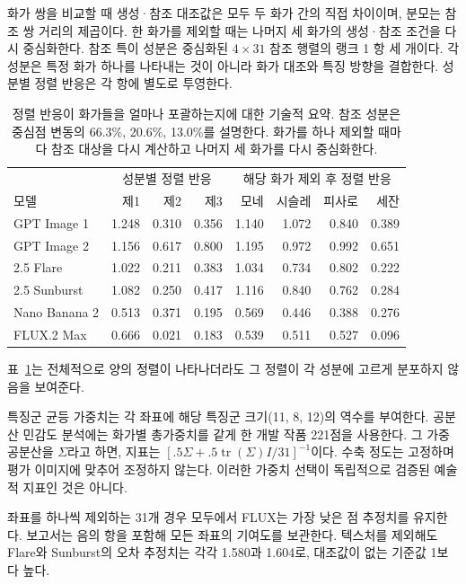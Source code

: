\documentclass[11pt,a4paper]{article}
\begin{document}
화가 쌍을 비교할 때 생성·참조 대조값은 모두 두 화가 간의 직접 차이이며, 분모는 참조 쌍 거리의 제곱이다. 한 화가를 제외할 때는 나머지 세 화가의 생성·참조 조건을 다시 중심화한다. 참조 특이 성분은 중심화된 $4\times31$ 참조 행렬의 랭크 1 항 세 개이다. 각 성분은 특정 화가 하나를 나타내는 것이 아니라 화가 대조와 특징 방향을 결합한다. 성분별 정렬 반응은 각 항에 별도로 투영한다.

\begin{table}[H]
\centering\small\setlength{\tabcolsep}{4pt}
\begin{tabular}{@{}lrrr|rrrr@{}}
\toprule
 & \multicolumn{3}{c}{성분별 정렬 반응} & \multicolumn{4}{c}{해당 화가 제외 후 정렬 반응}\\
모델 & 제1 & 제2 & 제3 & 모네 & 시슬레 & 피사로 & 세잔\\\midrule
GPT Image 1 & 1.248 & 0.310 & 0.356 & 1.140 & 1.072 & 0.840 & 0.389\\
GPT Image 2 & 1.156 & 0.617 & 0.800 & 1.195 & 0.972 & 0.992 & 0.651\\
2.5 Flare & 1.022 & 0.211 & 0.383 & 1.034 & 0.734 & 0.802 & 0.222\\
2.5 Sunburst & 1.082 & 0.250 & 0.417 & 1.116 & 0.840 & 0.762 & 0.284\\
Nano Banana 2 & 0.513 & 0.371 & 0.195 & 0.569 & 0.446 & 0.388 & 0.276\\
FLUX.2 Max & 0.666 & 0.021 & 0.183 & 0.539 & 0.511 & 0.527 & 0.096\\
\bottomrule
\end{tabular}
\caption{정렬 반응이 화가들을 얼마나 포괄하는지에 대한 기술적 요약. 참조 성분은 중심점 변동의 66.3\%, 20.6\%, 13.0\%를 설명한다. 화가를 하나 제외할 때마다 참조 대상을 다시 계산하고 나머지 세 화가를 다시 중심화한다.}
\label{tab:review-components}
\end{table}

표~\ref{tab:review-components}는 전체적으로 양의 정렬이 나타나더라도 그 정렬이 각 성분에 고르게 분포하지 않음을 보여준다.

특징군 균등 가중치는 각 좌표에 해당 특징군 크기(11, 8, 12)의 역수를 부여한다. 공분산 민감도 분석에는 화가별 총가중치를 같게 한 개발 작품 221점을 사용한다. 그 가중 공분산을 $\Sigma$라고 하면, 지표는 $[.5\Sigma+.5\operatorname{tr}(\Sigma)I/31]^{-1}$이다. 수축 정도는 고정하며 평가 이미지에 맞추어 조정하지 않는다. 이러한 가중치 선택이 독립적으로 검증된 예술적 지표인 것은 아니다.

좌표를 하나씩 제외하는 31개 경우 모두에서 FLUX는 가장 낮은 점 추정치를 유지한다. 보고서는 음의 항을 포함해 모든 좌표의 기여도를 보관한다. 텍스처를 제외해도 Flare와 Sunburst의 오차 추정치는 각각 1.580과 1.604로, 대조값이 없는 기준값 1보다 높다.
\end{document}

